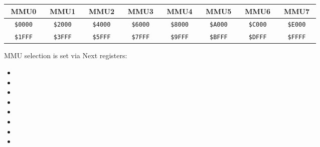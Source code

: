 \documentclass[12pt,twoside,openright,a4paper]{book}
\newcommand{\notet}{\rule{0pt}{2.4ex}}
\newcommand{\noteb}{\rule[-1.3ex]{0pt}{0pt}}
\begin{document}
\begingroup
	\setlength{\tabcolsep}{1pt}
	\begin{tabular}{|cccc|cccc|cccc|cccc|cccc|cccc|cccc|cccc|}
		\hline
		\multicolumn{4}{|c}{MMU0}\notet\noteb & 
			\multicolumn{4}{|c}{MMU1} & 
			\multicolumn{4}{|c}{MMU2} & 
			\multicolumn{4}{|c}{MMU3} & 
			\multicolumn{4}{|c}{MMU4} & 
			\multicolumn{4}{|c}{MMU5} & 
			\multicolumn{4}{|c}{MMU6} & 
			\multicolumn{4}{|c|}{MMU7} \\
		\hline
		\colnoline{$\leftarrow$}\notet & \multicolumn{2}{c}{\tt \$0000} & \colnoline{} &
			\colnoline{$\leftarrow$}\notet & \multicolumn{2}{c}{\tt \$2000} & \colnoline{} &
			\colnoline{$\leftarrow$}\notet & \multicolumn{2}{c}{\tt \$4000} & \colnoline{} &
			\colnoline{$\leftarrow$}\notet & \multicolumn{2}{c}{\tt \$6000} & \colnoline{} &
			\colnoline{$\leftarrow$}\notet & \multicolumn{2}{c}{\tt \$8000} & \colnoline{} &
			\colnoline{$\leftarrow$}\notet & \multicolumn{2}{c}{\tt \$A000} & \colnoline{} &
			\colnoline{$\leftarrow$}\notet & \multicolumn{2}{c}{\tt \$C000} & \colnoline{} &
			\colnoline{$\leftarrow$}\notet & \multicolumn{2}{c}{\tt \$E000} & \colnoline{} \\
		\colnoline{} & \multicolumn{2}{c}{\tt \$1FFF} & \colnoline{$\rightarrow$} &
			\colnoline{} & \multicolumn{2}{c}{\tt \$3FFF} & \colnoline{$\rightarrow$} &
			\colnoline{} & \multicolumn{2}{c}{\tt \$5FFF} & \colnoline{$\rightarrow$} &
			\colnoline{} & \multicolumn{2}{c}{\tt \$7FFF} & \colnoline{$\rightarrow$} &
			\colnoline{} & \multicolumn{2}{c}{\tt \$9FFF} & \colnoline{$\rightarrow$} &
			\colnoline{} & \multicolumn{2}{c}{\tt \$BFFF} & \colnoline{$\rightarrow$} &
			\colnoline{} & \multicolumn{2}{c}{\tt \$DFFF} & \colnoline{$\rightarrow$} &
			\colnoline{} & \multicolumn{2}{c}{\tt \$FFFF} & \colnoline{$\rightarrow$} \\
	\end{tabular}
\endgroup

MMU selection is set via Next registers:

\begin{itemize}[topsep=1pt,itemsep=1pt]
	\item {}
	\item {}
	\item {}
	\item {}
	\item {}
	\item {}
	\item {}
	\item {}
\end{itemize}
\end{document}
